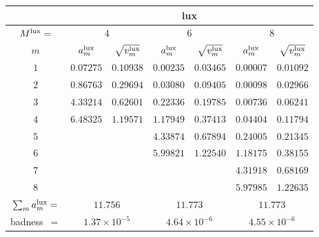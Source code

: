 \begin{tabular}{c|cc|cc|cc|}
&
\multicolumn{6}{|c|}{lux} \\
\hline
$M^{\mathrm{lux}}=$ &
 \multicolumn{2}{|c|}{$4$} &
 \multicolumn{2}{|c|}{$6$} &
 \multicolumn{2}{|c|}{$8$} \\
$m$ &
 $a^{\mathrm{lux}}_m$ & $\sqrt{v^{\mathrm{lux}}_m}$ &
 $a^{\mathrm{lux}}_m$ & $\sqrt{v^{\mathrm{lux}}_m}$ &
 $a^{\mathrm{lux}}_m$ & $\sqrt{v^{\mathrm{lux}}_m}$ \\
$1$ &
 $0.07275$ & $0.10938$ &
 $0.00235$ & $0.03465$ &
 $0.00007$ & $0.01092$ \\
$2$ &
 $0.86763$ & $0.29694$ &
 $0.03080$ & $0.09405$ &
 $0.00098$ & $0.02966$ \\
$3$ &
 $4.33214$ & $0.62601$ &
 $0.22336$ & $0.19785$ &
 $0.00736$ & $0.06241$ \\
$4$ &
 $6.48325$ & $1.19571$ &
 $1.17949$ & $0.37413$ &
 $0.04404$ & $0.11794$ \\
$5$ &
 $~$ & $~$ &
 $4.33874$ & $0.67894$ &
 $0.24005$ & $0.21345$ \\
$6$ &
 $~$ & $~$ &
 $5.99821$ & $1.22540$ &
 $1.18175$ & $0.38155$ \\
$7$ &
 $~$ & $~$ &
 $~$ & $~$ &
 $4.31918$ & $0.68169$ \\
$8$ &
 $~$ & $~$ &
 $~$ & $~$ &
 $5.97985$ & $1.22635$ \\
\hline
$\sum_m a^{\mathrm{lux}}_m=$ &
 \multicolumn{2}{|c|}{$11.756$} &
 \multicolumn{2}{|c|}{$11.773$} &
 \multicolumn{2}{|c|}{$11.773$} \\
badness~$=$ &
 \multicolumn{2}{|c|}{$1.37\times 10^{-5}$} &
 \multicolumn{2}{|c|}{$4.64\times 10^{-6}$} &
 \multicolumn{2}{|c|}{$4.55\times 10^{-6}$} \\
\end{tabular}
